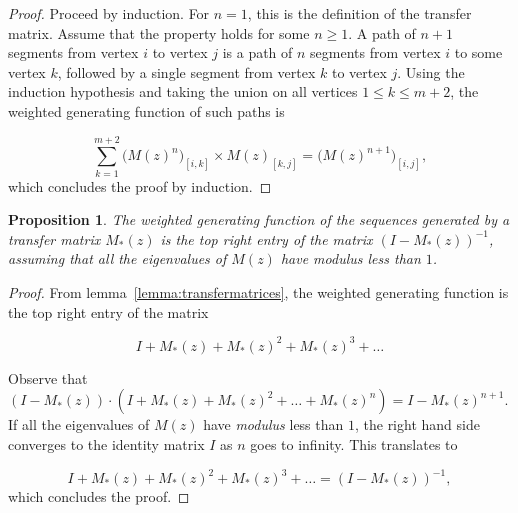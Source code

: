\documentclass{article}
\newtheorem{proposition}{Proposition}
\begin{document}
\begin{proof}
Proceed by induction. For $n = 1$, this is the definition of the transfer
matrix. Assume that the property holds for some $n \geq 1$. A path of
$n+1$ segments from vertex $i$ to vertex $j$ is a path of $n$ segments
from vertex $i$ to some vertex $k$, followed by a single segment from
vertex $k$ to vertex $j$. Using the induction hypothesis and taking the
union on all vertices $1 \leq k \leq m+2$, the weighted generating
function of such paths is

\begin{equation*}
\sum_{k = 1}^{m+2} \Big(M(z)^n\Big)_{[i,k]} \times M(z)_{[k,j]}
= \Big(M(z)^{n+1}\Big)_{[i,j]},
\end{equation*}
which concludes the proof by induction.
\end{proof}

\begin{proposition}
\label{prop:transfermatrices}
The weighted generating function of the sequences generated by a transfer
matrix $M_*(z)$ is the top right entry of the matrix $(I-M_*(z))^{-1}$,
assuming that all the eigenvalues of $M(z)$ have \textit{modulus} less
than $1$.
\end{proposition}

\begin{proof}
From lemma~\ref{lemma:transfermatrices}, the weighted generating function
is the top right entry of the matrix

\begin{equation*}
I + M_*(z) + M_*(z)^2 + M_*(z)^3 + \ldots
\end{equation*}

Observe that $(I-M_*(z)) \cdot (I+M_*(z)+M_*(z)^2+ \ldots + M_*(z)^n) =
I-M_*(z)^{n+1}$. If all the eigenvalues of $M(z)$ have \textit{modulus}
less than $1$, the right hand side converges to the identity matrix $I$ as
$n$ goes to infinity. This translates to

\begin{equation*}
I + M_*(z) + M_*(z)^2 + M_*(z)^3 + \ldots = (I-M_*(z))^{-1},
\end{equation*}
which concludes the proof.
\end{proof}
\end{document}
